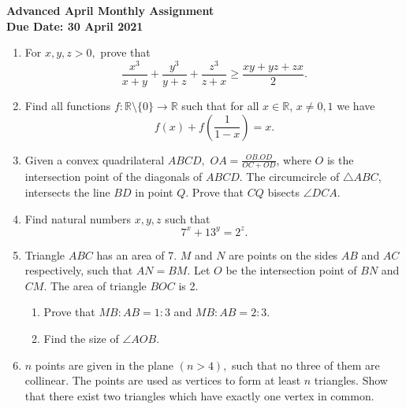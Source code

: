\documentclass{article}
\begin{document}
\thispagestyle{empty}

\begin{center}
  \textbf{\Large Advanced April Monthly Assignment}
  \\ \vspace{1em}
  \textbf{\large Due Date: 30 April 2021}
\end{center}

\vspace{12pt}

\begin{enumerate}[1.]

\vspace{6pt}
\item %
For $x,y,z >0,$ prove that $$\frac{x^3}{x+y}+\frac{y^3}{y+z} + \frac{z^3}{z+x} \geq \frac{xy+yz+zx}{2}.$$

\item %
Find all functions $f:\mathbb{R}\setminus\{0\}\to\mathbb{R}$ such that for all $x\in\mathbb{R}$, $x\ne 0,1$ we have
	$$f(x)+f\left(\frac{1}{1-x}\right)=x.$$

\item %
Given a convex quadrilateral $ABCD,$ $ OA = \frac{OB.OD}{OC+OD}$, where $O$ is the intersection point of the diagonals of $ABCD$. The circumcircle of $\triangle ABC$, intersects the line $BD$ in point $Q$. Prove that $CQ$ bisects $\angle DCA.$\\

\item %
Find natural numbers $x,y,z$ such that $$7^x +13^y = 2^z.$$

\item %
Triangle $ABC$ has an area of 7. $M$ and $N$ are points on the sides $AB$ and $AC$ respectively, such that $AN = BM.$ Let $O$ be the intersection point of $BN$ and $CM.$ The area of triangle $BOC$ is 2.
\begin{enumerate}
\item Prove that $MB:AB = 1:3$ and $MB:AB = 2:3.$
\item Find the size of $\angle AOB.$\\
\end{enumerate}

\item %
$n$ points are given in the plane $(n > 4),$ such that no three of them are collinear. The points are used as vertices to form at least $n$ triangles. Show that there exist two triangles which have exactly one vertex in common.

\end{enumerate}
\end{document}
